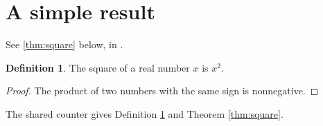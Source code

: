 \usepackage[english]{babel}
\usepackage{amsthm,cleveref}
\newtheorem{theorem}{Theorem}[section]
\theoremstyle{definition}
\newtheorem{definition}[theorem]{Definition}

\section{A simple result}\label{sec:result}

See \cref{thm:square} below, in .

\begin{definition}\label{def:square}
The square of a real number $x$ is $x^2$.
\end{definition}


\begin{proof}
The product of two numbers with the same sign is nonnegative.
\end{proof}

The shared counter gives Definition \ref{def:square} and Theorem \ref{thm:square}.
